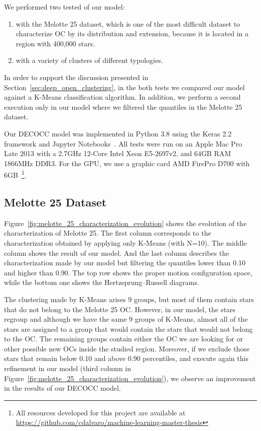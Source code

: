 \documentclass[11pt,a4paper,english,twocolumn]{article}
\begin{document}
We performed two tested of our model:

\begin{enumerate}
  \item with the Melotte 25 dataset, which is one of the most difficult dataset to characterize OC
        by its distribution and extension, because it is located in a region with 400,000 stars.
  \item with a variety of clusters of different typologies.
\end{enumerate}

In order to support the discussion presented in Section~\ref{sec:deep_open_clustering}, in the both
tests we compared our model against a K-Means classification algorithm. In addition, we perform a
second execution only in our model where we filtered the quantiles in the Melotte 25 dataset.

Our DECOCC model was implemented in Python 3.8 using the Keras 2.2 framework and Jupyter
Notebooks~\cite{Kluyver2016jupyter}. All tests were run on an Apple Mac Pro Late 2013 with a
2.7GHz 12-Core Intel Xeon E5-2697v2, and 64GB RAM 1866MHz DDR3. For the GPU, we use a graphic
card AMD FirePro D700 with 6GB~\footnote{All resources developed for this project are available
at \href{https://github.com/cdalvaro/machine-learning-master-thesis}
{https://github.com/cdalvaro/machine-learning-master-thesis}}.

\subsection{Melotte 25 Dataset}

Figure~\ref{fig:melotte_25_characterization_evolution} shows the evolution of the characterization
of Melotte 25. The first column corresponds to the characterization obtained by applying only
K-Means (with N=10). The middle column shows the result of our model. And the last column describes
the characterization made by our model but filtering the quantiles lower than 0.10 and higher than
0.90. The top row shows the proper motion configuration space, while the bottom one shows the
Hertzsprung–Russell diagrams.


The clustering made by K-Means arises 9 groups, but most of them contain stars that do not belong
to the Melotte 25 OC. However, in our model, the stars regroup and although we have the same 9
groups of K-Means, almost all of the stars are assigned to a group that would contain the stars
that would not belong to the OC. The remaining groups contain either the OC we are looking for or
other possible new OCs inside the studied region. Moreover, if we exclude those stars that remain
below 0.10 and above 0.90 percentiles, and execute again this refinement in our model (third column
in Figure~\ref{fig:melotte_25_characterization_evolution}), we observe an improvement in the
results of our DECOCC model.
\end{document}
